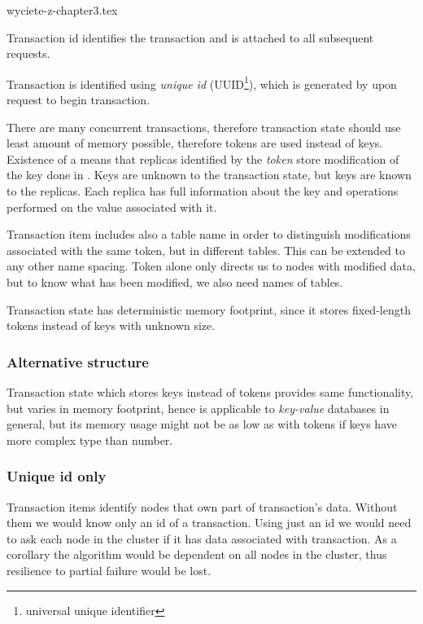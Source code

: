 wyciete-z-chapter3.tex

Transaction id identifies the transaction and is attached to all subsequent requests. 

Transaction \transaction is identified using \emph{unique id} (UUID\footnote{universal unique identifier}), which is generated by  upon request to begin transaction. 

There are many concurrent transactions, therefore transaction state should use least amount of memory possible, therefore tokens are used instead of keys. Existence of a \txItem means that replicas identified by the \emph{token} store modification of the key done in \transaction. Keys are unknown to the transaction state, but keys are known to the replicas. Each replica has full information about the key and operations performed on the value associated with it. 

Transaction item includes also a table name in order to distinguish modifications associated with the same token, but in different tables. This can be extended to any other name spacing.
Token alone only directs us to nodes with modified data, but to know what has been modified, we also need names of tables. 

Transaction state has deterministic memory footprint, since it stores fixed-length tokens instead of keys with unknown size. 


\subsubsection{Alternative structure}
Transaction state which stores keys instead of tokens provides same functionality, but varies in memory footprint, hence \mpt is applicable to \emph{key-value} databases in general, but its memory usage might not be as low as with tokens if keys have more complex type than number.

\subsubsection{Unique id only}
Transaction items identify nodes that own part of transaction's data. Without them we would know only an id of a transaction.
Using just an id we would need to ask each node in the cluster if it has data associated with transaction. As a corollary the algorithm would be dependent on all nodes in the cluster, thus resilience to partial failure would be lost.

